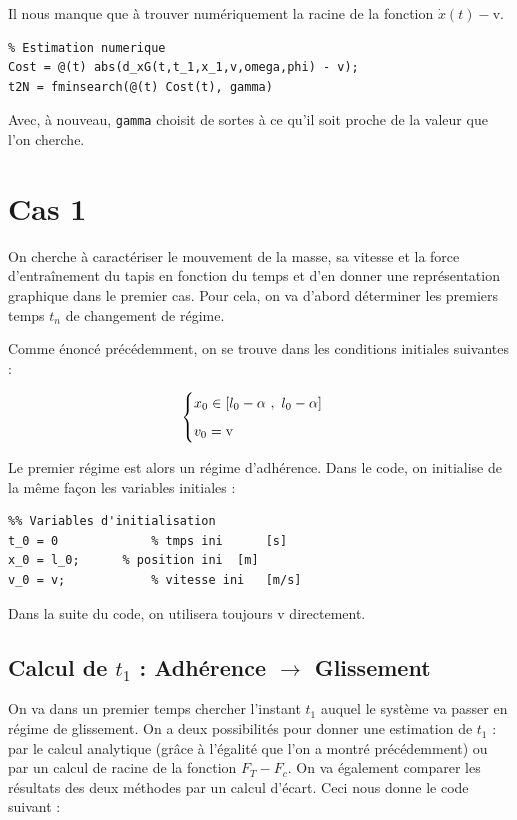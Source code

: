 \documentclass{article}
\newcommand{\ts}{\scriptscriptstyle}
\begin{document}
Il nous manque que à trouver numériquement la racine de la fonction $\dot x(t) -$v.
\begin{lstlisting}
% Estimation numerique
Cost = @(t) abs(d_xG(t,t_1,x_1,v,omega,phi) - v);
t2N = fminsearch(@(t) Cost(t), gamma)
\end{lstlisting}

Avec, à nouveau, \verb|gamma| choisit de sortes à ce qu'il soit proche de la valeur que l'on cherche.

\newpage
\section{Cas 1}
On cherche à caractériser le mouvement de la masse, sa vitesse et la force d'entraînement du tapis en fonction du temps et d'en donner une représentation graphique dans le premier cas. Pour cela, on va d'abord déterminer les premiers temps $t_n$ de changement de régime.   
  
Comme énoncé précédemment, on se trouve dans les conditions initiales suivantes : 

$$
\begin{cases}
	\vspace{.2cm}
	x_0\in [l_0-\alpha~,~l_0-\alpha]\\
	v_0 = \text{v}
\end{cases}
$$

Le premier régime est alors un régime d'adhérence. Dans le code, on initialise de la même façon les variables initiales : 
\begin{lstlisting}
%% Variables d'initialisation
t_0 = 0 			% tmps ini		[s]
x_0 = l_0; 		% position ini	[m]
v_0 = v;			% vitesse ini	[m/s]       
\end{lstlisting}

Dans la suite du code, on utilisera toujours v directement. 


\subsection{Calcul de $t_1$ : Adhérence $\rightarrow$ Glissement}\label{ssec_3.1}
On va dans un premier temps chercher l'instant $t_1$ auquel le système va passer en régime de glissement. On a deux possibilités pour donner une estimation de $t_1$ : par le calcul analytique (grâce à l'égalité que l'on a montré précédemment) ou par un calcul de racine de la fonction $F_{\ts T}-F_c$. On va également comparer les résultats des deux méthodes par un calcul d'écart. Ceci nous donne le code suivant :
\end{document}
